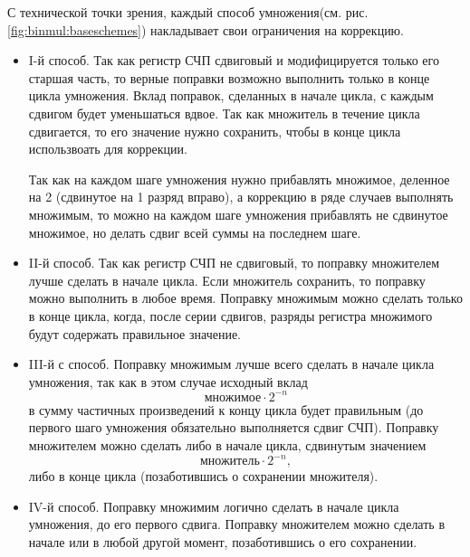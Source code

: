 С технической точки зрения, каждый способ умножения(см. рис. \ref{fig:binmul:baseschemes}) накладывает свои ограничения на коррекцию.
\begin{itemize}
    \item I-й способ. Так как регистр СЧП сдвиговый и модифицируется только его старшая часть, то верные поправки возможно выполнить только в конце цикла умножения. Вклад поправок, сделанных в начале цикла, с каждым сдвигом будет уменьшаться вдвое. Так как множитель в течение цикла сдвигается, то его значение нужно сохранить, чтобы в конце цикла использвоать для коррекции.
    
    Так как на каждом шаге умножения нужно прибавлять множимое, деленное на 2 (сдвинутое на 1 разряд вправо), а коррекцию в ряде случаев выполнять множимым, то можно на каждом шаге умножения прибавлять не сдвинутое множимое, но делать сдвиг всей суммы на последнем шаге.
    
    \item II-й способ. Так как регистр СЧП не сдвиговый, то поправку множителем лучше сделать в начале цикла. Если множитель сохранить, то поправку можно выполнить в любое время. Поправку множимым можно сделать только в конце цикла, когда, после серии сдвигов, разряды регистра множимого будут содержать правильное значение.

    \item III-й с способ. Поправку множимым лучше всего сделать в начале цикла умножения, так как в этом случае исходный вклад 
    \[
        \texttt{множимое}\cdot 2^{-n}
    \]
    в сумму частичных произведений к концу цикла будет правильным (до первого шаго умножения обязательно выполняется сдвиг СЧП). Поправку множителем можно сделать либо в начале цикла, сдвинутым значением 
    \[
        \texttt{множитель}\cdot 2^{-n},
    \]
    либо в конце цикла (позаботившись о сохранении множителя).
    
    \item IV-й способ. Поправку множимим логично сделать в начале цикла умножения, до его первого сдвига. Поправку множителем можно сделать в начале или в любой другой момент, позаботившись о его сохранении.
\end{itemize}  